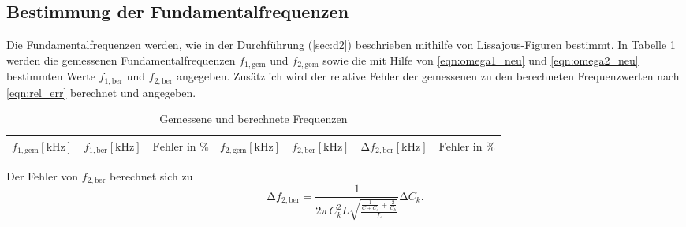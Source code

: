 \subsection{Bestimmung der Fundamentalfrequenzen}

Die Fundamentalfrequenzen werden, wie in der Durchführung (\ref{sec:d2}) beschrieben mithilfe von Lissajous-Figuren bestimmt.
In Tabelle \ref{tab:3} werden die gemessenen Fundamentalfrequenzen $f_{1,\text{gem}}$ und $f_{2,\text{gem}}$ sowie die mit Hilfe von \eqref{eqn:omega1_neu} und \eqref{eqn:omega2_neu} bestimmten Werte $f_{1,\text{ber}}$ und $f_{2,\text{ber}}$ angegeben.
Zusätzlich wird der relative Fehler der gemessenen zu den berechneten Frequenzwerten nach \eqref{eqn:rel_err} berechnet und angegeben.
\begin{table}
  \centering
  \caption{Gemessene und berechnete Frequenzen}
  \label{tab:3}
  \begin{tabular}{c c c c c c c}
    \toprule
    {$f_{1,\text{gem}} [\si{\kilo\hertz}]$} & {$f_{1,\text{ber}} [\si{\kilo\hertz}]$} & {$\text{Fehler in \%}$} & {$f_{2,\text{gem}} [\si{\kilo\hertz}]$} & {$f_{2,\text{ber}} [\si{\kilo\hertz}]$} & {$\increment f_{2,\text{ber}} [\si{\kilo\hertz}]$} & {$\text{Fehler in \%}$} \\
    \midrule
    
    \bottomrule
  \end{tabular}
\end{table}
Der Fehler von $f_{2,\text{ber}}$ berechnet sich zu
\begin{equation}
\increment{f_{2,\text{ber}}} = \frac{1}{2 \pi\, C_k^2 L \sqrt{ \frac{\frac{1}{C+C_s} + \frac{2}{C_k}}{L} } } \increment{C_k}.
\end{equation}
%
%
%
%
%
%    
%
%
